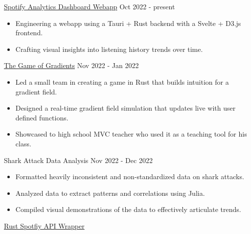 \documentclass[9pt]{resume}
\begin{document}

    \begin{experiencelist}
        \experience 
            {\href{https://github.com/TheSharkhead2/Spotify_Analytics_Dashboard}{Spotify Analytics Dashboard Webapp}}
            {Oct 2022 - present}
            {}
            {\begin{itemize}[noitemsep, topsep=1pt]
                \item Engineering a webapp using a Tauri + Rust backend with a Svelte + D3.js frontend. 
                \item Crafting visual insights into listening history trends over time.
            \end{itemize}}
        \experience 
            {\href{https://github.com/TheSharkhead2/The_Game_of_Gradients}{The Game of Gradients}}
            {Nov 2022 - Jan 2022}
            {}
            {\begin{itemize}[noitemsep, topsep=1pt] 
                \item Led a small team in creating a game in Rust that builds intuition for a gradient field.
                \item Designed a real-time gradient field simulation that updates live with user defined functions. 
                \item Showcased to high school MVC teacher who used it as a teaching tool for his class.
            \end{itemize}}
        \experience 
            {Shark Attack Data Analysis}
            {Nov 2022 - Dec 2022}
            {}
            {\begin{itemize}[noitemsep, topsep=1pt]
                \item Formatted heavily inconsistent and non-standardized data on shark attacks.
                \item Analyzed data to extract patterns and correlations using Julia. 
                \item Compiled visual demonstrations of the data to effectively articulate trends. 
            \end{itemize}}
        \experience
            {\href{https://github.com/TheSharkhead2/spotify.rs}{Rust Spotfiy API Wrapper}}

\end{experiencelist}
\end{document}
